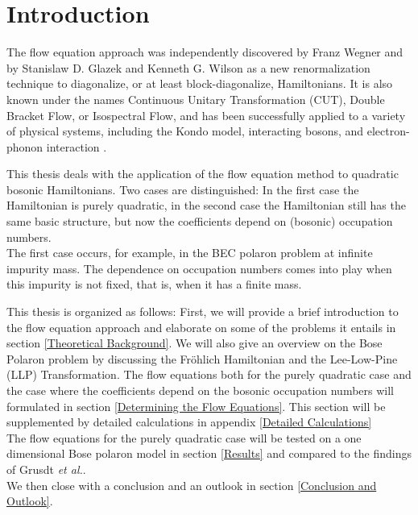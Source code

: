 \chapter{Introduction}
The flow equation approach was independently discovered by Franz Wegner \cite{https://doi.org/10.1002/andp.19945060203} and by Stanislaw D. Glazek and Kenneth G. Wilson \cite{PhysRevD.48.5863} as a new renormalization technique to diagonalize, or at least block-diagonalize, Hamiltonians. It is also known under the names Continuous Unitary Transformation (CUT), Double Bracket Flow, or Isospectral Flow, and has been successfully applied to a variety of physical systems, including the Kondo model, interacting bosons, and electron-phonon interaction \cite{Wegner_2006}.\par
This thesis deals with the application of the flow equation method to quadratic bosonic Hamiltonians. Two cases are distinguished: In the first case the Hamiltonian is purely quadratic, in the second case the Hamiltonian still has the same basic structure, but now the coefficients depend on (bosonic) occupation numbers.\\
The first case occurs, for example, in the BEC polaron problem at infinite impurity mass. The dependence on occupation numbers comes into play when this impurity is not fixed, that is, when it has a finite mass.\par
This thesis is organized as follows: First, we will provide a brief introduction to the flow equation approach and elaborate on some of the problems it entails in section \ref{Theoretical Background}. We will also give an overview on the Bose Polaron problem by discussing the Fröhlich Hamiltonian and the Lee-Low-Pine (LLP) Transformation. The flow equations  both for the purely quadratic case and the case where the coefficients depend on the bosonic occupation numbers will formulated in section \ref{Determining the Flow Equations}. This section will be supplemented by detailed calculations in appendix \ref{Detailed Calculations}\\
The flow equations for the purely quadratic case will be tested on a one dimensional Bose polaron model in section \ref{Results} and compared to the findings of Grusdt \emph{et al.}\cite{Grusdt_2017}. \\
We then close with a conclusion and an outlook in section \ref{Conclusion and Outlook}.
